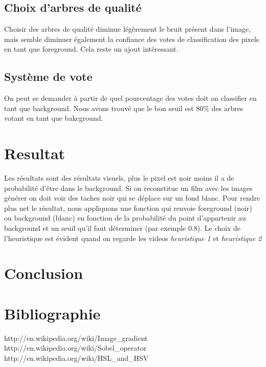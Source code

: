 \documentclass[8pt,a4paper]{article}
\begin{document}
\begin{multicols}{2}
	\subsection{Choix d'arbres de qualité}
	Choisir des arbres de qualité diminue légèrement le bruit présent dans l'image, mais semble diminuer également la confiance des votes
	de classification des pixels en tant que foreground. Cela reste un ajout intéressant. 

	\subsection{Système de vote}
	On peut se demander à partir de quel pourcentage des votes doit on classifier en tant que background. Nous avons trouvé que le bon
	seuil est 80\% des arbres votant en tant que bakcground.

\section{Resultat}
Les résultats sont des résultats visuels, plus le pixel est noir moins il a de probabilité d'être dans le background. Si on reconstitue un film avec les images générer on doit voir des taches noir qui se déplace sur un fond blanc. Pour rendre plus net le résultat, nous appliquons une fonction qui renvoie foreground (noir) ou background (blanc) en fonction de la probabilité du point d'appartenir au background et un seuil qu'il faut déterminer (par exemple 0.8). 
Le choix de l'heuristique est évident quand on regarde les videos \textit{heuristique 1} et \textit{heuristique 2}

\section{Conclusion}

	
	
\section{Bibliographie}	
\begin{thebibliography}{2}
    http://en.wikipedia.org/wiki/Image\_gradient
    http://en.wikipedia.org/wiki/Sobel\_operator
    http://en.wikipedia.org/wiki/HSL\_and\_HSV  
\end{thebibliography}

\end{multicols}
\end{document}
